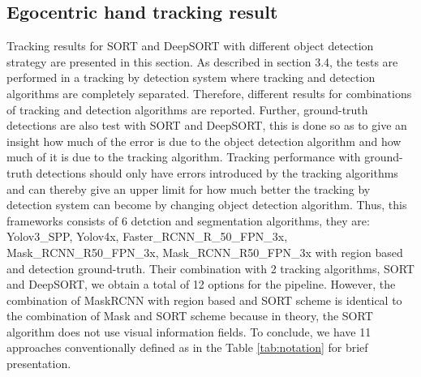 \subsection{Egocentric hand tracking result}
Tracking results for SORT and DeepSORT with different object detection strategy are presented in this section. As described in section 3.4, the tests are performed in a tracking by detection system where tracking and detection algorithms are completely separated. Therefore, different results for combinations of tracking and detection algorithms are reported. Further, ground-truth detections are also test with SORT and DeepSORT, this is done so as to give an insight how much of the error is due to the object detection algorithm and how much of it is due to the tracking algorithm. Tracking performance with ground-truth detections should only have errors introduced by the tracking algorithms and can thereby give an upper limit for how much better the tracking by detection system can become by changing object detection algorithm. Thus, this frameworks consists of 6 detction and segmentation algorithms, they are: Yolov3\_SPP, Yolov4x, Faster\_RCNN\_R\_50\_FPN\_3x, Mask\_RCNN\_R50\_FPN\_3x, Mask\_RCNN\_R50\_FPN\_3x with region based and detection ground-truth. Their combination with 2 tracking algorithms, SORT and DeepSORT, we obtain a total of 12 options for the pipeline. However, the combination of MaskRCNN with region based and SORT scheme is identical to the combination of Mask and SORT scheme because in theory, the SORT algorithm does not use visual information fields. To conclude, we have 11 approaches conventionally defined as in the Table \ref{tab:notation} for brief presentation.
